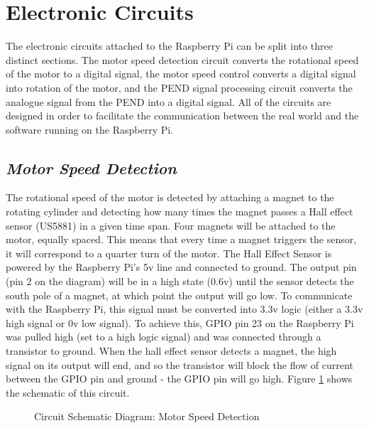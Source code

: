 \documentclass[a4]{report}
\begin{document}
	\section{Electronic Circuits}
	The electronic circuits attached to the Raspberry Pi can be split into three distinct sections. The motor speed detection circuit converts the rotational speed of the motor to a digital signal, the motor speed control converts a digital signal into rotation of the motor, and the PEND signal processing circuit converts the analogue signal from the PEND into a digital signal. All of the circuits are designed in order to facilitate the communication between the real world and the software running on the Raspberry Pi. 



	\subsection{\textit{Motor Speed Detection}}
	The rotational speed of the motor is detected by attaching a magnet to the rotating cylinder and detecting how many times the magnet passes a Hall effect sensor (US5881) in a given time span. Four magnets will be attached to the motor, equally spaced. This means that every time a magnet triggers the sensor, it will correspond to a quarter turn of the motor. The Hall Effect Sensor is powered by the Raspberry Pi's 5v line and connected to ground. The output pin (pin 2 on the diagram) will be in a high state (0.6v) until the sensor detects the south pole of a magnet, at which point the output will go low. To communicate with the Raspberry Pi, this signal must be converted into 3.3v logic (either a 3.3v high signal or 0v low signal). To achieve this, GPIO pin 23 on the Raspberry Pi was pulled high (set to a high logic signal) and was connected through a transistor to ground. When the hall effect sensor detects a magnet, the high signal on its output will end, and so the transistor will block the flow of current between the GPIO pin and ground - the GPIO pin will go high. Figure \ref{circhall} shows the schematic of this circuit. \newline
	\begin{figure}[!h]
		\centering
		\caption{Circuit Schematic Diagram: Motor Speed Detection}
		\label{circhall}
	\end{figure} \newline  \noindent
\end{document}

